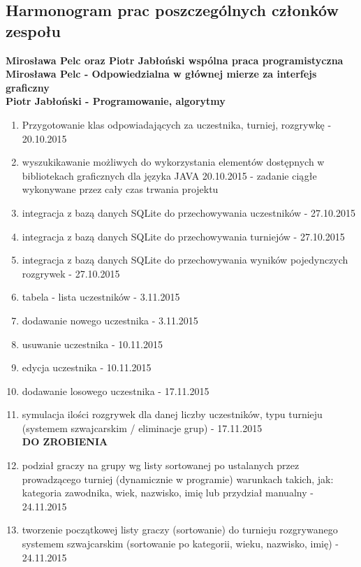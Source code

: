 \subsection{Harmonogram prac poszczególnych członków zespołu}
\textbf{Mirosława Pelc oraz Piotr Jabłoński wspólna praca programistyczna\\
Mirosława Pelc - Odpowiedzialna w głównej mierze za interfejs graficzny\\
Piotr Jabłoński - Programowanie, algorytmy\\}
\begin{enumerate}
\item Przygotowanie klas odpowiadających za uczestnika, turniej, rozgrywkę - 20.10.2015
\item wyszukikawanie możliwych do wykorzystania elementów dostępnych w bibliotekach graficznych dla języka JAVA 20.10.2015 - zadanie ciągłe wykonywane przez cały czas trwania projektu\\

\item integracja z bazą danych SQLite do przechowywania uczestników - 27.10.2015
\item integracja z bazą danych SQLite do przechowywania turniejów - 27.10.2015
\item integracja z bazą danych SQLite do przechowywania wyników pojedynczych rozgrywek - 27.10.2015\\

\item tabela - lista uczestników - 3.11.2015
\item dodawanie nowego uczestnika - 3.11.2015\\

\item usuwanie uczestnika - 10.11.2015
\item edycja uczestnika - 10.11.2015\\

\item dodawanie losowego uczestnika - 17.11.2015
\item symulacja ilości rozgrywek dla danej liczby uczestników, typu turnieju (systemem szwajcarskim / eliminacje grup) - 17.11.2015\\


\textbf{DO ZROBIENIA\\}

\item podział graczy na grupy wg listy sortowanej po ustalanych przez prowadzącego turniej (dynamicznie w programie) warunkach 
takich, jak: kategoria zawodnika, wiek, nazwisko, imię lub przydział manualny - 24.11.2015
\item tworzenie początkowej listy graczy (sortowanie) do turnieju rozgrywanego systemem szwajcarskim 
(sortowanie po kategorii, wieku, nazwisko, imię) - 24.11.2015\\


\end{enumerate}
